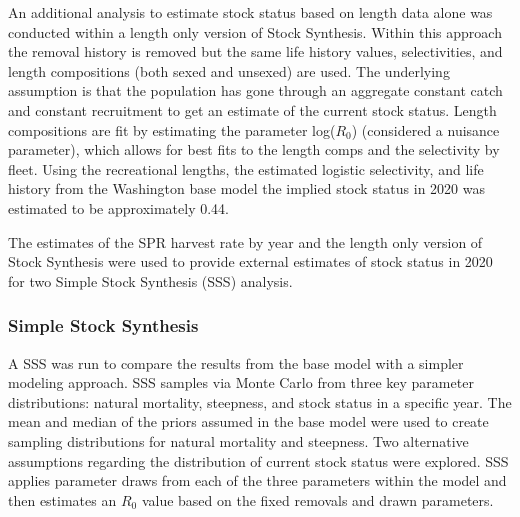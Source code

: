\documentclass[11pt,
  english,
  a4paper,
]{article}
\begin{document}

An additional analysis to estimate stock status based on length data alone was conducted within a length only version of Stock Synthesis. Within this approach the removal history is removed but the same life history values, selectivities, and length compositions (both sexed and unsexed) are used. The underlying assumption is that the population has gone through an aggregate constant catch and constant recruitment to get an estimate of the current stock status. Length compositions are fit by estimating the parameter log({\(R_0\)\leavevmode\tagmcend\tagstructend}) (considered a nuisance parameter), which allows for best fits to the length comps and the selectivity by fleet. Using the recreational lengths, the estimated logistic selectivity, and life history from the Washington base model the implied stock status in 2020 was estimated to be approximately 0.44.

\leavevmode\tagmcend\tagstructend\par


The estimates of the SPR harvest rate by year and the length only version of Stock Synthesis were used to provide external estimates of stock status in 2020 for two Simple Stock Synthesis (SSS) analysis.

\leavevmode\tagmcend\tagstructend\par


\hypertarget{simple-stock-synthesis}{%
\subsubsection{Simple Stock Synthesis}\label{simple-stock-synthesis}}

\leavevmode\tagmcend\tagstructend


A SSS was run to compare the results from the base model with a simpler modeling approach. SSS samples via Monte Carlo from three key parameter distributions: natural mortality, steepness, and stock status in a specific year. The mean and median of the priors assumed in the base model were used to create sampling distributions for natural mortality and steepness. Two alternative assumptions regarding the distribution of current stock status were explored. SSS applies parameter draws from each of the three parameters within the model and then estimates an {\(R_0\)\leavevmode\tagmcend\tagstructend} value based on the fixed removals and drawn parameters.
\end{document}
